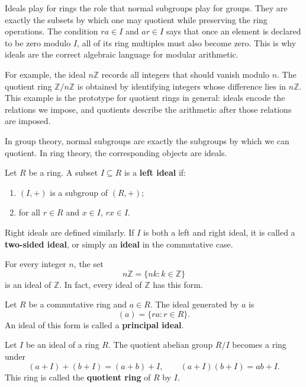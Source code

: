 Ideals play for rings the role that normal subgroups play for groups. They are exactly the subsets by which one may quotient while preserving the ring operations. The condition $ra\in I$ and $ar\in I$ says that once an element is declared to be zero modulo $I$, all of its ring multiples must also become zero. This is why ideals are the correct algebraic language for modular arithmetic.

For example, the ideal $n\mathbb{Z}$ records all integers that should vanish modulo $n$. The quotient ring $\mathbb{Z}/n\mathbb{Z}$ is obtained by identifying integers whose difference lies in $n\mathbb{Z}$. This example is the prototype for quotient rings in general: ideals encode the relations we impose, and quotients describe the arithmetic after those relations are imposed.

In group theory, normal subgroups are exactly the subgroups by which we can quotient. In ring theory, the corresponding objects are ideals.

\begin{definition}[Ideal]
Let $R$ be a ring. A subset $I\subseteq R$ is a \textbf{left ideal} if:
\begin{enumerate}
    \item $(I,+)$ is a subgroup of $(R,+)$;
    \item for all $r\in R$ and $x\in I$, $rx\in I$.
\end{enumerate}
Right ideals are defined similarly. If $I$ is both a left and right ideal, it is called a \textbf{two-sided ideal}, or simply an \textbf{ideal} in the commutative case.
\end{definition}

\begin{example}
For every integer $n$, the set
\[
    n\mathbb{Z}=\{nk:k\in\mathbb{Z}\}
\]
is an ideal of $\mathbb{Z}$. In fact, every ideal of $\mathbb{Z}$ has this form.
\end{example}

\begin{definition}
Let $R$ be a commutative ring and $a\in R$. The ideal generated by $a$ is
\[
    (a)=\{ra:r\in R\}.
\]
An ideal of this form is called a \textbf{principal ideal}.
\end{definition}

\begin{definition}
Let $I$ be an ideal of a ring $R$. The quotient abelian group $R/I$ becomes a ring under
\[
    (a+I)+(b+I)=(a+b)+I,
    \qquad
    (a+I)(b+I)=ab+I.
\]
This ring is called the \textbf{quotient ring} of $R$ by $I$.
\end{definition}

